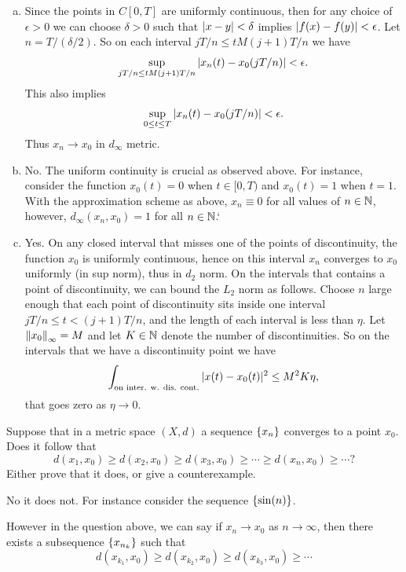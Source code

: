 \begin{solution}
	\begin{enumerate}[(a)]
		\item Since the points in $ C[0,T] $ are uniformly continuous, then for any choice of $ \epsilon>0 $ we can choose $ \delta>0 $ such that $ |x-y|<\delta $ implies $ |f(x)-f(y)|<\epsilon $. Let $ n = T/(\delta/2) $. So on each interval $ jT/n \leq t M (j+1)T/n $ we have 
		\[ \sup_{jT/n \leq t M (j+1)T/n} |x_n(t) - x_0(jT/n)| < \epsilon. \]
		This also implies
		\[  \sup_{0\leq t\leq T} |x_n(t) - x_0(jT/n)| < \epsilon. \]
		Thus $ x_n \to x_0 $ in $ d_\infty $ metric.
		
		\item No. The uniform continuity is crucial as observed above. For instance, consider the function $ x_0(t) = 0 $ when $ t\in [0,T) $ and $ x_0(t) = 1 $ when $ t=1 $. With the approximation scheme as above, $ x_n \equiv 0 $ for all values of $ n\in \mathbb{N} $, however, $ d_\infty (x_n,x_0) = 1 $ for all $ n\in \mathbb{N} $.`
		
		\item Yes. On any closed interval that misses one of the points of discontinuity, the function $ x_0 $ is uniformly continuous, hence on this interval $ x_n $ converges to $ x_0 $ uniformly (in sup norm), thus in $ d_2 $ norm. On the intervals that contains a point of discontinuity, we can bound the $ L_2 $ norm as follows. Choose $ n $ large enough that each point of discontinuity sits inside one interval $ jT/n \leq t < (j+1)T/n $, and the length of each interval is less than $ \eta $. Let $ \norm{x_0}_\infty = M $ and let $ K\in \mathbb{N} $ denote the number of discontinuities. So on the intervals that we have a discontinuity point we have
		\[ \int_{\text{on inter. w. dis. cont.}} |x(t)-x_0(t)|^2 \leq M^2 K \eta, \]
		that goes zero as $ \eta\to 0 $.
	\end{enumerate}
\end{solution}

\begin{problem}
	Suppose that in a metric space $ (X,d) $ a sequence $ \{x_n\} $ converges to a point $ x_0 $. Does it follow that
	\[ d(x_1,x_0) \geq d(x_2,x_0) \geq d(x_3,x_0) \geq \cdots \geq d(x_n,x_0) \geq \cdots ? \]
	Either prove that it does, or give a counterexample.
\end{problem}
\begin{solution}
	No it does not. For instance consider the sequence $ \{\sin(n)\} $.
\end{solution}
\begin{remark}
	However in the question above, we can say if $ x_n\to x_0 $ as $ n\to\infty $, then there exists a subsequence $ \{x_{n_k}\} $ such that
	\[ d(x_{k_1},x_0) \geq d(x_{k_2},x_0) \geq d(x_{k_3},x_0) \geq \cdots   \]
\end{remark}







